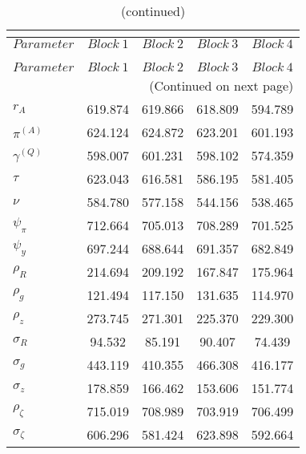  
\begin{center}
\begin{longtable}{lcccc} 
\caption{MCMC Inefficiency factors per block}\\
 \label{Table:MCMC_inefficiency_factors}\\
\toprule 
$Parameter         $	 & 	 $     Block~1$	 & 	 $     Block~2$	 & 	 $     Block~3$	 & 	 $     Block~4$\\
\midrule \endfirsthead 
\caption{(continued)}\\
 \toprule \\ 
$Parameter         $	 & 	 $     Block~1$	 & 	 $     Block~2$	 & 	 $     Block~3$	 & 	 $     Block~4$\\
\midrule \endhead 
\midrule \multicolumn{5}{r}{(Continued on next page)} \\ \bottomrule \endfoot 
\bottomrule \endlastfoot 
$ {r_{A}}          $	 & 	     619.874	 & 	     619.866	 & 	     618.809	 & 	     594.789 \\ 
$ {\pi^{(A)}}      $	 & 	     624.124	 & 	     624.872	 & 	     623.201	 & 	     601.193 \\ 
$ {\gamma^{(Q)}}   $	 & 	     598.007	 & 	     601.231	 & 	     598.102	 & 	     574.359 \\ 
$ {\tau}           $	 & 	     623.043	 & 	     616.581	 & 	     586.195	 & 	     581.405 \\ 
$ {\nu}            $	 & 	     584.780	 & 	     577.158	 & 	     544.156	 & 	     538.465 \\ 
$ {\psi_\pi}       $	 & 	     712.664	 & 	     705.013	 & 	     708.289	 & 	     701.525 \\ 
$ {\psi_y}         $	 & 	     697.244	 & 	     688.644	 & 	     691.357	 & 	     682.849 \\ 
$ {\rho_R}         $	 & 	     214.694	 & 	     209.192	 & 	     167.847	 & 	     175.964 \\ 
$ {\rho_{g}}       $	 & 	     121.494	 & 	     117.150	 & 	     131.635	 & 	     114.970 \\ 
$ {\rho_z}         $	 & 	     273.745	 & 	     271.301	 & 	     225.370	 & 	     229.300 \\ 
$ {\sigma_R}       $	 & 	      94.532	 & 	      85.191	 & 	      90.407	 & 	      74.439 \\ 
$ {\sigma_{g}}     $	 & 	     443.119	 & 	     410.355	 & 	     466.308	 & 	     416.177 \\ 
$ {\sigma_z}       $	 & 	     178.859	 & 	     166.462	 & 	     153.606	 & 	     151.774 \\ 
$ {\rho_\zeta}     $	 & 	     715.019	 & 	     708.989	 & 	     703.919	 & 	     706.499 \\ 
$ {\sigma_\zeta}   $	 & 	     606.296	 & 	     581.424	 & 	     623.898	 & 	     592.664 \\ 
\end{longtable}
 \end{center}
